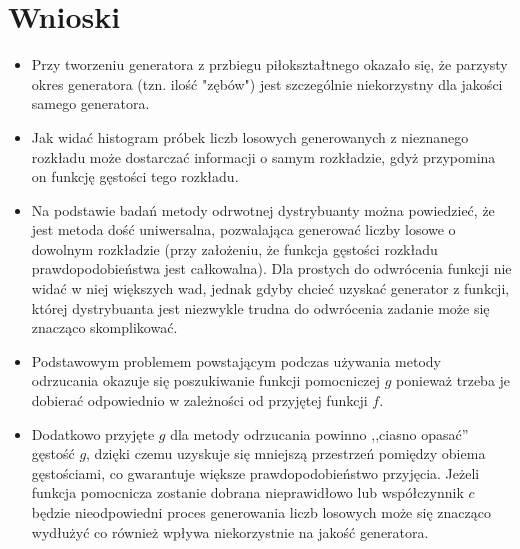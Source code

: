 \documentclass[12pt,a4paper]{article}
\begin{document}
\section{Wnioski}
\begin{itemize}
\item Przy tworzeniu generatora z przbiegu piłokształtnego okazało się, że parzysty okres generatora (tzn. ilość "zębów") jest szczególnie niekorzystny dla jakości samego generatora.
\item Jak widać histogram próbek liczb losowych generowanych z nieznanego rozkładu może dostarczać informacji o samym rozkładzie, gdyż przypomina on funkcję gęstości tego rozkładu.
\item Na podstawie badań metody odrwotnej dystrybuanty można powiedzieć, że jest metoda dość uniwersalna, pozwalająca generować liczby losowe o dowolnym rozkładzie (przy założeniu, że funkcja gęstości rozkładu prawdopodobieństwa jest całkowalna).
Dla prostych do odwrócenia funkcji nie widać w niej większych wad, jednak gdyby chcieć uzyskać generator z funkcji, której dystrybuanta jest niezwykle trudna do odwrócenia zadanie może się znacząco skomplikować.
\item Podstawowym problemem powstającym podczas używania metody odrzucania okazuje się poszukiwanie funkcji pomocniczej $g$ ponieważ trzeba je dobierać odpowiednio w zależności od przyjętej funkcji $f$.
\item Dodatkowo przyjęte $g$ dla metody odrzucania powinno ,,ciasno opasać'' gęstość $g$, dzięki czemu uzyskuje się mniejszą przestrzeń pomiędzy obiema gęstościami, co gwarantuje większe prawdopodobieństwo przyjęcia. Jeżeli funkcja pomocnicza zostanie dobrana nieprawidłowo lub współczynnik $c$ będzie nieodpowiedni proces generowania liczb losowych może się znacząco wydłużyć co również wpływa niekorzystnie na jakość generatora.
\end{itemize}

\nocite{rachunek2006jakubowski}
\nocite{mzykGeneracja}
\nocite{rejectionMethodSigman}
 


\end{document}
